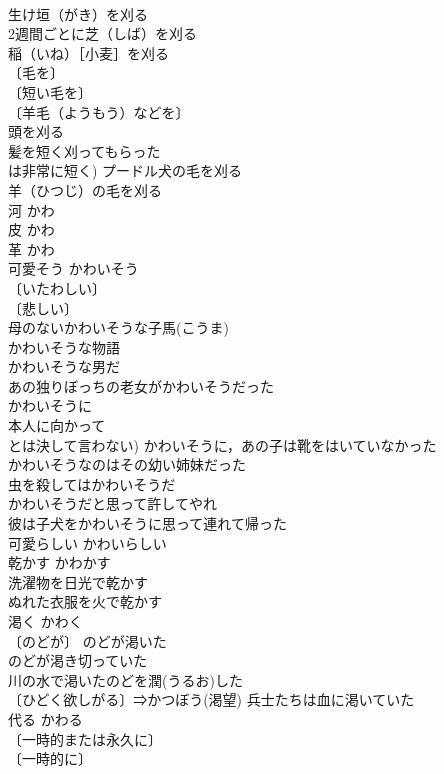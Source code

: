\documentclass[8pt]{extreport}
\begin{document}
\begin{CJK}{UTF8}{min}
\\	生け垣（がき）を刈る 
\\	2週間ごとに芝（しば）を刈る 
\\	稲（いね）［小麦］を刈る 
\\	〔毛を〕
\\	〔短い毛を〕
\\	〔羊毛（ようもう）などを〕
\\	頭を刈る 
\\	髪を短く刈ってもらった 
\\	は非常に短く) プードル犬の毛を刈る 
\\	羊（ひつじ）の毛を刈る 
\\	河	かわ	
\\	皮	かわ	
\\	革	かわ	
\\	可愛そう	かわいそう	
\\	〔いたわしい〕
\\	〔悲しい〕
\\	母のないかわいそうな子馬(こうま) 
\\	かわいそうな物語 
\\	かわいそうな男だ 
\\	あの独りぼっちの老女がかわいそうだった 
\\	かわいそうに 
\\	本人に向かって 
\\	とは決して言わない) かわいそうに，あの子は靴をはいていなかった 
\\	かわいそうなのはその幼い姉妹だった 
\\	虫を殺してはかわいそうだ 
\\	かわいそうだと思って許してやれ 
\\	彼は子犬をかわいそうに思って連れて帰った 
\\	可愛らしい	かわいらしい	
\\	乾かす	かわかす	
\\	洗濯物を日光で乾かす 
\\	ぬれた衣服を火で乾かす 
\\	渇く	かわく	
\\	〔のどが〕 のどが渇いた 
\\	のどが渇き切っていた 
\\	川の水で渇いたのどを潤(うるお)した 
\\	〔ひどく欲しがる〕⇒かつぼう(渇望) 兵士たちは血に渇いていた 
\\	代る	かわる	
\\	〔一時的または永久に〕
\\	〔一時的に〕

\end{CJK}
\end{document}
